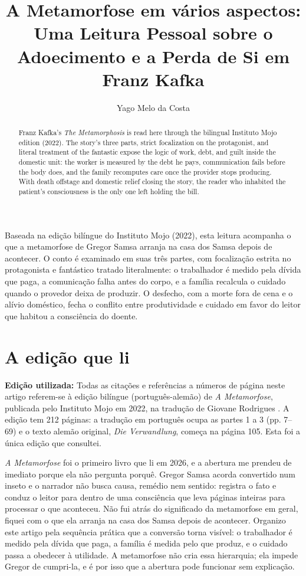 \documentclass[12pt]{article}
\title{A Metamorfose em vários aspectos: Uma Leitura Pessoal sobre o Adoecimento e a Perda de Si em Franz Kafka}
\author{Yago Melo da Costa}
\begin{document}
\maketitle

\begin{resumo}
Baseada na edição bilíngue do Instituto Mojo (2022), esta leitura acompanha o que a metamorfose de Gregor Samsa arranja na casa dos Samsa depois de acontecer. O conto é examinado em suas três partes, com focalização estrita no protagonista e fantástico tratado literalmente: o trabalhador é medido pela dívida que paga, a comunicação falha antes do corpo, e a família recalcula o cuidado quando o provedor deixa de produzir. O desfecho, com a morte fora de cena e o alívio doméstico, fecha o conflito entre produtividade e cuidado em favor do leitor que habitou a consciência do doente.
\end{resumo}

\begin{abstract}
Franz Kafka's \emph{The Metamorphosis} is read here through the bilingual Instituto Mojo edition (2022). The story's three parts, strict focalization on the protagonist, and literal treatment of the fantastic expose the logic of work, debt, and guilt inside the domestic unit: the worker is measured by the debt he pays, communication fails before the body does, and the family recomputes care once the provider stops producing. With death offstage and domestic relief closing the story, the reader who inhabited the patient's consciousness is the only one left holding the bill.
\end{abstract}

\section{A edição que li}

\noindent
\textbf{Edição utilizada:} Todas as citações e referências a números de página neste artigo referem-se à edição bilíngue (português-alemão) de \emph{A Metamorfose}, publicada pelo Instituto Mojo em 2022, na tradução de Giovane Rodrigues \cite{kafka2022}. A edição tem 212 páginas: a tradução em português ocupa as partes 1 a 3 (pp. 7--69) e o texto alemão original, \emph{Die Verwandlung}, começa na página 105. Esta foi a única edição que consultei.

\emph{A Metamorfose} foi o primeiro livro que li em 2026, e a abertura me prendeu de imediato porque ela não pergunta porquê. Gregor Samsa acorda convertido num inseto e o narrador não busca causa, remédio nem sentido: registra o fato e conduz o leitor para dentro de uma consciência que leva páginas inteiras para processar o que aconteceu. Não fui atrás do significado da metamorfose em geral, fiquei com o que ela arranja na casa dos Samsa depois de acontecer. Organizo este artigo pela sequência prática que a conversão torna visível: o trabalhador é medido pela dívida que paga, a família é medida pelo que produz, e o cuidado passa a obedecer à utilidade. A metamorfose não cria essa hierarquia; ela impede Gregor de cumpri-la, e é por isso que a abertura pode funcionar sem explicação.
\end{document}
